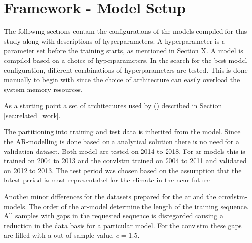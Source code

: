 \section{Framework - Model Setup}
The following sections contain the configurations of the models compiled for this study along with descriptions of hyperparameters. A hyperparameter is a parameter set before the training starts, as mentioned in Section X. A model is compiled based on a choice of hyperparameters. In the search for the best model configuration, different combinations of hyperparameters are tested. This is done manually to begin with since the choice of architecture can easily overload the system memory resources.

As a starting point a set of architectures used by \citeauthor{SunAirLSTM} (\citeyear{SunAirLSTM}) described in Section \ref{sec:related_work}.

The partitioning into training and test data is inherited from the model. Since the AR-modelling is done based on a analytical solution there is no need for a validation dataset. Both model are tested on 2014 to 2018. For \acrshort{ar}-models this is trained on 2004 to 2013 and the \acrshort{convlstm} trained on  2004 to 2011 and validated on  2012 to 2013. The test period was chosen based on the assumption that the latest period is most representabel for the climate in the near future.

Another minor differences for the datasets prepared for the \acrshort{ar} and the \acrshort{convlstm}-models. The order of the \acrshort{ar}-model determine the length of the training sequence. All samples with gaps in the requested sequence is disregarded causing a reduction in the data basis for a particular model. For the \acrshort{convlstm} these gaps are filled with a out-of-sample value, $c=1.5$.


